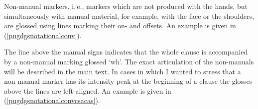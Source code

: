 Non-manual markers, i.\,e., markers which are not produced with the hands, but simultaneously with manual material, for example, with the face or the shoulders, are glossed using lines marking their on- and offsets. An example is given in (\ref{pugdgsnotationalconv}).


\begin{exe}
\ex\label{pugdgsnotationalconv}
\end{exe}




\noindent The line above the manual signs indicates that the whole clause is accompanied by a non-manual marking glossed `wh'. The exact articulation of the non-manuals will be described in the main text. In cases in which I wanted to stress that a non-manual marker has its intensity peak at the beginning of a clause the glosses above the lines are left-aligned. An example is given in (\ref{pugdgsnotationalconvcsacas}).

\begin{exe}
\ex\label{pugdgsnotationalconvcsacas}
\end{exe}
 
